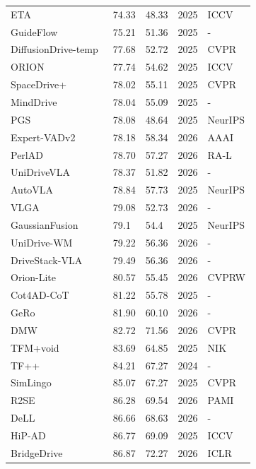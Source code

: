 \documentclass[10pt,twocolumn,letterpaper]{article}
\begin{document}
\begin{table}[t]
\begin{tabular}{l|ll|ll}
ETA~\cite{Hamdan2025ICCV} & 74.33 & 48.33 & 2025 & ICCV \\
GuideFlow~\cite{Liu2025ARXIVe} & 75.21 & 51.36 & 2025 & - \\
DiffusionDrive-temp~\cite{Liao2025CVPR} & 77.68 & 52.72 & 2025 & CVPR \\
ORION~\cite{Fu2025ICCV} & 77.74 & 54.62 & 2025 & ICCV \\
SpaceDrive+~\cite{Li2025ARXIVc} & 78.02 & 55.11 & 2025 & CVPR \\
MindDrive~\cite{Fu2025ARXIV} & 78.04 & 55.09 & 2025 & - \\
PGS~\cite{Huang2025NEURIPS} & 78.08 & 48.64 & 2025 & NeurIPS \\
Expert-VADv2~\cite{Jiang2026AAAI} & 78.18 & 58.34 & 2026 & AAAI \\
PerlAD~\cite{Gao20262ARXIV} & 78.70 & 57.27 & 2026 & RA-L \\
UniDriveVLA~\cite{Li2026ARXIV} & 78.37 & 51.82 & 2026 & - \\
AutoVLA~\cite{Zhou2025NEURIPS} & 78.84 & 57.73 & 2025 & NeurIPS \\
VLGA~\cite{Yao2026ARXIV} & 79.08 & 52.73 & 2026 & - \\
GaussianFusion~\cite{Liu2025NEURIPS} & 79.1 & 54.4 & 2025 & NeurIPS \\
UniDrive-WM~\cite{Xiong2026ARXIV} & 79.22 & 56.36 & 2026 & - \\
DriveStack-VLA~\cite{Wang2026ARXIVb} & 79.49 & 56.36 & 2026 & - \\
Orion-Lite~\cite{Gu2026CVPRWORK} & 80.57 & 55.45 & 2026 & CVPRW \\
Cot4AD-CoT~\cite{Wang2025ARXIVc} & 81.22 & 55.78 & 2025 & - \\
GeRo~\cite{Yasarla2026ARXIV} & 81.90 & 60.10 & 2026 & - \\
DMW~\cite{Wang2026CVPR} & 82.72 & 71.56 & 2026 & CVPR \\
TFM+void~\cite{Winje2025NIK} & 83.69 & 64.85 & 2025 & NIK \\
TF++~\cite{Zimmerlin2024ArXiv} & 84.21 & 67.27 & 2024 & - \\
SimLingo~\cite{Renz2025CVPR} & 85.07 & 67.27 & 2025 & CVPR \\
R2SE~\cite{Liu2026PAMI} & 86.28 & 69.54 & 2026 & PAMI \\
DeLL~\cite{Du2026ARXIV} & 86.66 & 68.63 & 2026 & - \\
HiP-AD~\cite{Tang2025ICCV} & 86.77 & 69.09 & 2025 & ICCV \\
BridgeDrive~\cite{Liu2026ICLR} & 86.87 & 72.27 & 2026 & ICLR \\

\end{tabular}
\end{table}
\end{document}
